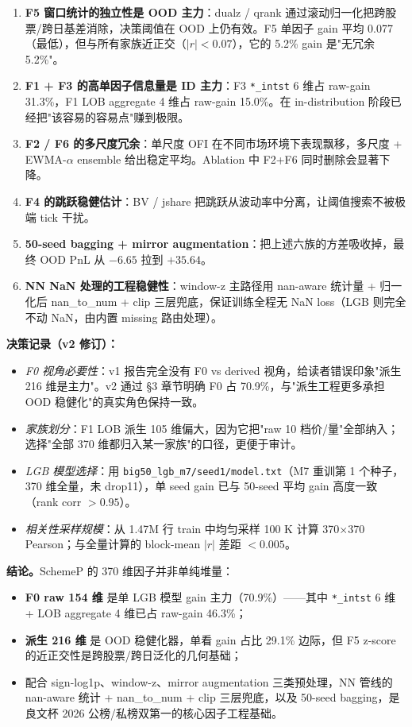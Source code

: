 \documentclass[10.5pt,a4paper]{article}
\begin{document}
\begin{enumerate}[leftmargin=2em,itemsep=2pt,topsep=2pt]
  \item \textbf{F5 窗口统计的独立性是 OOD 主力}：dualz / qrank 通过滚动归一化把跨股票/跨日基差消除，决策阈值在 OOD 上仍有效。F5 单因子 gain 平均 0.077（最低），但与所有家族近正交（$|r|<0.07$），它的 5.2\% gain 是"无冗余 5.2\%"。
  \item \textbf{F1 + F3 的高单因子信息量是 ID 主力}：F3 \texttt{*\_intst} 6 维占 raw-gain 31.3\%，F1 LOB aggregate 4 维占 raw-gain 15.0\%。在 in-distribution 阶段已经把"该容易的容易点"赚到极限。
  \item \textbf{F2 / F6 的多尺度冗余}：单尺度 OFI 在不同市场环境下表现飘移，多尺度 + EWMA-$\alpha$ ensemble 给出稳定平均。Ablation 中 F2+F6 同时删除会显著下降。
  \item \textbf{F4 的跳跃稳健估计}：BV / jshare 把跳跃从波动率中分离，让阈值搜索不被极端 tick 干扰。
  \item \textbf{50-seed bagging + mirror augmentation}：把上述六族的方差吸收掉，最终 OOD PnL 从 $-6.65$ 拉到 $+35.64$。
  \item \textbf{NN NaN 处理的工程稳健性}：window-z 主路径用 nan-aware 统计量 + 归一化后 nan\_to\_num + clip 三层兜底，保证训练全程无 NaN loss（LGB 则完全不动 NaN，由内置 missing 路由处理）。
\end{enumerate}

\textbf{决策记录（v2 修订）：}
\begin{itemize}[leftmargin=2em,itemsep=2pt,topsep=2pt]
  \item \emph{F0 视角必要性}：v1 报告完全没有 F0 vs derived 视角，给读者错误印象"派生 216 维是主力"。v2 通过 §3 章节明确 F0 占 70.9\%，与"派生工程更多承担 OOD 稳健化"的真实角色保持一致。
  \item \emph{家族划分}：F1 LOB 派生 105 维偏大，因为它把"raw 10 档价/量"全部纳入；选择"全部 370 维都归入某一家族"的口径，更便于审计。
  \item \emph{LGB 模型选择}：用 \texttt{big50\_lgb\_m7/seed1/model.txt}（M7 重训第 1 个种子，370 维全量，未 drop11），单 seed gain 已与 50-seed 平均 gain 高度一致（rank corr $>0.95$）。
  \item \emph{相关性采样规模}：从 1.47M 行 train 中均匀采样 100 K 计算 370$\times$370 Pearson；与全量计算的 block-mean $|r|$ 差距 $<0.005$。
\end{itemize}

\textbf{结论。}SchemeP 的 370 维因子并非单纯堆量：
\begin{itemize}[leftmargin=2em,itemsep=1pt,topsep=2pt]
  \item \textbf{F0 raw 154 维} 是单 LGB 模型 gain 主力（70.9\%）——其中 \texttt{*\_intst} 6 维 + LOB aggregate 4 维已占 raw-gain 46.3\%；
  \item \textbf{派生 216 维} 是 OOD 稳健化器，单看 gain 占比 29.1\% 边际，但 F5 z-score 的近正交性是跨股票/跨日泛化的几何基础；
  \item 配合 sign-log1p、window-z、mirror augmentation 三类预处理，NN 管线的 nan-aware 统计 + nan\_to\_num + clip 三层兜底，以及 50-seed bagging，是良文杯 2026 公榜/私榜双第一的核心因子工程基础。
\end{itemize}
\end{document}
